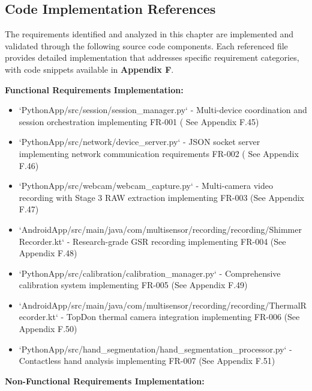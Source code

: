 \documentclass[12pt,a4paper]{report}
\begin{document}
\subsection{Code Implementation References}

The requirements identified and analyzed in this chapter are implemented and validated through the following source code
components. Each referenced file provides detailed implementation that addresses specific requirement categories, with
code snippets available in \textbf{Appendix F}.

\textbf{Functional Requirements Implementation:}

\begin{itemize}
\item `PythonApp/src/session/session_manager.py` - Multi-device coordination and session orchestration implementing FR-001 (
  See Appendix F.45)
\item `PythonApp/src/network/device_server.py` - JSON socket server implementing network communication requirements FR-002 (
  See Appendix F.46)
\item `PythonApp/src/webcam/webcam_capture.py` - Multi-camera video recording with Stage 3 RAW extraction implementing
  FR-003 (See Appendix F.47)
\item `AndroidApp/src/main/java/com/multisensor/recording/recording/ShimmerRecorder.kt` - Research-grade GSR recording
  implementing FR-004 (See Appendix F.48)
\item `PythonApp/src/calibration/calibration_manager.py` - Comprehensive calibration system implementing FR-005 (See
  Appendix F.49)
\item `AndroidApp/src/main/java/com/multisensor/recording/recording/ThermalRecorder.kt` - TopDon thermal camera integration
  implementing FR-006 (See Appendix F.50)
\item `PythonApp/src/hand_segmentation/hand_segmentation_processor.py` - Contactless hand analysis implementing FR-007 (See
  Appendix F.51)

\end{itemize}
\textbf{Non-Functional Requirements Implementation:}
\end{document}
